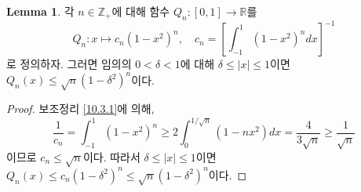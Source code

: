 \documentclass[11pt]{book}
\numberwithin{equation}{chapter}
\def\ZZ{\mathbb{Z}}
\def\RR{\mathbb{R}}
\newcommand{\abs}[1]{\left\vert#1\right\vert}
\newcommand{\sqbracket}[1]{\left[#1\right]}
\theoremstyle{definition}
\newtheorem{lem}[thm]{Lemma}
\begin{document}
\begin{lem} \label{10.3.2}
    각 \(n \in \ZZ_+\)에 대해 함수 \(Q_n : [0, 1] \to \RR\)를
    \[
    Q_n : x \mapsto c_n (1-x^2)^n, \quad c_n = \sqbracket{\int_{-1}^1 (1-x^2)^n dx}^{-1}
    \]
    로 정의하자. 그러면 임의의 \(0 < \delta < 1\)에 대해 \(\delta \le \abs{x} \le 1\)이면 \(Q_n(x) \le \sqrt{n}(1-\delta^2)^n\)이다.
\end{lem}
\begin{proof}
    보조정리 \ref{10.3.1}에 의해,
    \[
        \frac{1}{c_n} = \int_{-1}^1 (1-x^2)^n \ge 2 \int_0^{1/\sqrt{n}} (1-nx^2) dx = \frac{4}{3\sqrt{n}} \ge \frac{1}{\sqrt{n}}    
    \]
    이므로 \(c_n \le \sqrt{n}\)이다. 따라서 \(\delta \le \abs{x} \le 1\)이면 \(Q_n(x) \le c_n (1 - \delta^2)^n \le \sqrt{n}(1-\delta^2)^n\)이다.
\end{proof}
\end{document}

